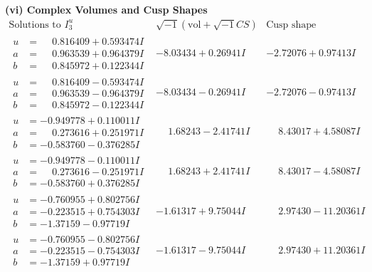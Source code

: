 \documentclass[1p]{elsarticle_modified}
\theoremstyle{definition}
\newcommand{\I}{\sqrt{-1}}
\begin{document}
\newpage\flushleft \textbf{(vi) Complex Volumes and Cusp Shapes}
$$\begin{array}{c|c|c}  
\text{Solutions to }I^u_{3}& \I (\text{vol} + \sqrt{-1}CS) & \text{Cusp shape}\\
 \hline 
\begin{aligned}
u &= \phantom{-}0.816409 + 0.593474 I \\
a &= \phantom{-}0.963539 + 0.964379 I \\
b &= \phantom{-}0.845972 + 0.122344 I\end{aligned}
 & -8.03434 + 0.26941 I & -2.72076 + 0.97413 I \\ \hline\begin{aligned}
u &= \phantom{-}0.816409 - 0.593474 I \\
a &= \phantom{-}0.963539 - 0.964379 I \\
b &= \phantom{-}0.845972 - 0.122344 I\end{aligned}
 & -8.03434 - 0.26941 I & -2.72076 - 0.97413 I \\ \hline\begin{aligned}
u &= -0.949778 + 0.110011 I \\
a &= \phantom{-}0.273616 + 0.251971 I \\
b &= -0.583760 - 0.376285 I\end{aligned}
 & \phantom{-}1.68243 - 2.41741 I & \phantom{-}8.43017 + 4.58087 I \\ \hline\begin{aligned}
u &= -0.949778 - 0.110011 I \\
a &= \phantom{-}0.273616 - 0.251971 I \\
b &= -0.583760 + 0.376285 I\end{aligned}
 & \phantom{-}1.68243 + 2.41741 I & \phantom{-}8.43017 - 4.58087 I \\ \hline\begin{aligned}
u &= -0.760955 + 0.802756 I \\
a &= -0.223515 + 0.754303 I \\
b &= -1.37159 - 0.97719 I\end{aligned}
 & -1.61317 + 9.75044 I & \phantom{-}2.97430 - 11.20361 I \\ \hline\begin{aligned}
u &= -0.760955 - 0.802756 I \\
a &= -0.223515 - 0.754303 I \\
b &= -1.37159 + 0.97719 I\end{aligned}
 & -1.61317 - 9.75044 I & \phantom{-}2.97430 + 11.20361 I \\ \hline\begin{aligned}

\end{aligned}
\end{array}$$
\end{document}
